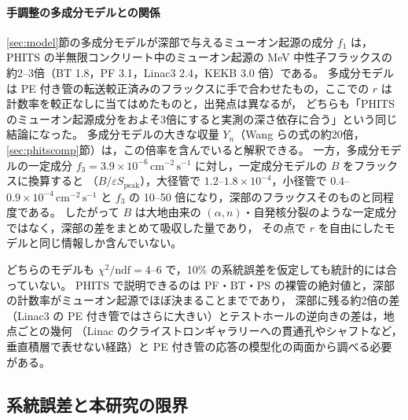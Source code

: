 \documentclass[a4paper,11pt]{ltjsarticle}
\newcommand{\eSpk}{\varepsilon S_{\mathrm{peak}}}
\newcommand{\flux}{\mathrm{cm^{-2}\,s^{-1}}}
\begin{document}
\paragraph{手調整の多成分モデルとの関係}
\ref{sec:model}節の多成分モデルが深部で与えるミューオン起源の成分 $f_1$ は，PHITS の半無限コンクリート中のミューオン起源の MeV 中性子フラックスの
約2--3倍（BT 1.8，PF 3.1，Linac3 2.4，KEKB 3.0 倍）である。
多成分モデルは PE 付き管の転送較正済みのフラックスに手で合わせたもの，ここでの $r$ は計数率を較正なしに当てはめたものと，出発点は異なるが，
どちらも「PHITS のミューオン起源成分をおよそ3倍にすると実測の深さ依存に合う」という同じ結論になった。
多成分モデルの大きな収量 $Y_n$（Wang らの式の約20倍，\ref{sec:phitscomp}節）は，この倍率を含んでいると解釈できる。
一方，多成分モデルの一定成分 $f_3=3.9\times10^{-6}\,\flux$ に対し，一定成分モデルの $B$ をフラックスに換算すると
（$B/\eSpk$），大径管で $1.2$--$1.8\times10^{-4}$，小径管で $0.4$--$0.9\times10^{-4}\,\flux$ と $f_3$ の 10--50 倍になり，深部のフラックスそのものと同程度である。
したがって $B$ は大地由来の $(\alpha,n)$・自発核分裂のような一定成分ではなく，深部の差をまとめて吸収した量であり，
その点で $r$ を自由にしたモデルと同じ情報しか含んでいない。

どちらのモデルも $\chi^2/\mathrm{ndf}=4$--6 で，10\% の系統誤差を仮定しても統計的には合っていない。
PHITS で説明できるのは PF・BT・PS の裸管の絶対値と，深部の計数率がミューオン起源でほぼ決まることまでであり，
深部に残る約2倍の差（Linac3 の PE 付き管ではさらに大きい）とテストホールの逆向きの差は，地点ごとの幾何
（Linac のクライストロンギャラリーへの貫通孔やシャフトなど，垂直積層で表せない経路）と PE 付き管の応答の模型化の両面から調べる必要がある。

\subsection{系統誤差と本研究の限界}
\label{sec:sys}
\end{document}
